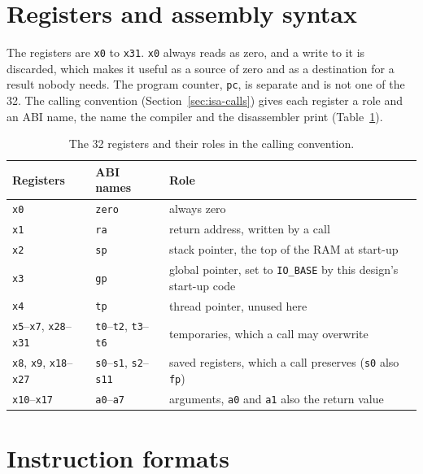 \documentclass[11pt,a4paper]{report}
\begin{document}
\section{Registers and assembly syntax}
\label{sec:isa-regs}

The registers are \texttt{x0} to \texttt{x31}. \texttt{x0} always reads as zero, and a write
to it is discarded, which makes it useful as a source of zero and as a destination for a
result nobody needs. The program counter, \texttt{pc}, is separate and is not one of the 32.
The calling convention (Section~\ref{sec:isa-calls}) gives each register a role and an ABI
name, the name the compiler and the disassembler print (Table~\ref{tab:isa-regs}).

\begin{table}[!ht]
  \centering
  \small
  \begin{tabular}{@{}lll@{}}
    \toprule
    Registers & ABI names & Role \\
    \midrule
    \texttt{x0} & \texttt{zero} & always zero \\
    \texttt{x1} & \texttt{ra} & return address, written by a call \\
    \texttt{x2} & \texttt{sp} & stack pointer, the top of the RAM at start-up \\
    \texttt{x3} & \texttt{gp} & global pointer, set to \texttt{IO\_BASE} by this design's
      start-up code \\
    \texttt{x4} & \texttt{tp} & thread pointer, unused here \\
    \texttt{x5}--\texttt{x7}, \texttt{x28}--\texttt{x31} & \texttt{t0}--\texttt{t2},
      \texttt{t3}--\texttt{t6} & temporaries, which a call may overwrite \\
    \texttt{x8}, \texttt{x9}, \texttt{x18}--\texttt{x27} & \texttt{s0}--\texttt{s1},
      \texttt{s2}--\texttt{s11} & saved registers, which a call preserves (\texttt{s0} also
      \texttt{fp}) \\
    \texttt{x10}--\texttt{x17} & \texttt{a0}--\texttt{a7} & arguments, \texttt{a0} and
      \texttt{a1} also the return value \\
    \bottomrule
  \end{tabular}
  \caption{The 32 registers and their roles in the calling convention.}
  \label{tab:isa-regs}
\end{table}

\section{Instruction formats}
\label{sec:isa-formats}
\end{document}
